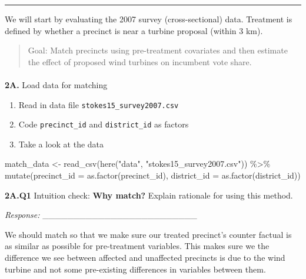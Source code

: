 \documentclass[
  letterpaper,
  DIV=11,
  numbers=noendperiod]{scrartcl}
\makeatletter
\let\oldparagraph\paragraph
\renewcommand{\paragraph}{
    \@ifstar
      \xxxParagraphStar
      \xxxParagraphNoStar
  }
\newcommand{\xxxParagraphStar}[1]{\oldparagraph*{#1}\mbox{}}
\newcommand{\xxxParagraphNoStar}[1]{\oldparagraph{#1}\mbox{}}
\newenvironment{Shaded}{\begin{snugshade}}{\end{snugshade}}
\newcommand{\AttributeTok}[1]{\textcolor[rgb]{0.40,0.45,0.13}{#1}}
\newcommand{\FunctionTok}[1]{\textcolor[rgb]{0.28,0.35,0.67}{#1}}
\newcommand{\NormalTok}[1]{\textcolor[rgb]{0.00,0.23,0.31}{#1}}
\newcommand{\OtherTok}[1]{\textcolor[rgb]{0.00,0.23,0.31}{#1}}
\newcommand{\SpecialCharTok}[1]{\textcolor[rgb]{0.37,0.37,0.37}{#1}}
\newcommand{\StringTok}[1]{\textcolor[rgb]{0.13,0.47,0.30}{#1}}
\providecommand{\tightlist}{%
  \setlength{\itemsep}{0pt}\setlength{\parskip}{0pt}}
\makeatother
\begin{document}
\begin{center}\rule{0.5\linewidth}{0.5pt}\end{center}

We will start by evaluating the 2007 survey (cross-sectional) data.
Treatment is defined by whether a precinct is near a turbine proposal
(within 3 km).

\begin{quote}
Goal: Match precincts using pre-treatment covariates and then estimate
the effect of proposed wind turbines on incumbent vote share.
\end{quote}

\paragraph{\texorpdfstring{\textbf{2A.} Load data for
matching}{2A. Load data for matching}}\label{a.-load-data-for-matching}

\begin{enumerate}
\def\labelenumi{\arabic{enumi}.}
\tightlist
\item
  Read in data file \texttt{stokes15\_survey2007.csv}
\item
  Code \texttt{precinct\_id} and \texttt{district\_id} as factors
\item
  Take a look at the data
\end{enumerate}

\begin{Shaded}
\begin{Highlighting}[]
\NormalTok{match\_data }\OtherTok{\textless{}{-}} \FunctionTok{read\_csv}\NormalTok{(}\FunctionTok{here}\NormalTok{(}\StringTok{"data"}\NormalTok{, }\StringTok{"stokes15\_survey2007.csv"}\NormalTok{)) }\SpecialCharTok{\%\textgreater{}\%} 
    \FunctionTok{mutate}\NormalTok{(}\AttributeTok{precinct\_id =} \FunctionTok{as.factor}\NormalTok{(precinct\_id),}
           \AttributeTok{district\_id =} \FunctionTok{as.factor}\NormalTok{(district\_id))}
\end{Highlighting}
\end{Shaded}

\textbf{2A.Q1} Intuition check: \textbf{Why match?} Explain rationale
for using this method.

\emph{Response:} \_\_\_\_\_\_\_\_\_\_\_\_\_\_\_\_\_\_\_\_\_\_\_\_\_

We should match so that we make sure our treated precinct's counter
factual is as similar as possible for pre-treatment variables. This
makes sure we the difference we see between affected and unaffected
precincts is due to the wind turbine and not some pre-existing
differences in variables between them.
\end{document}
